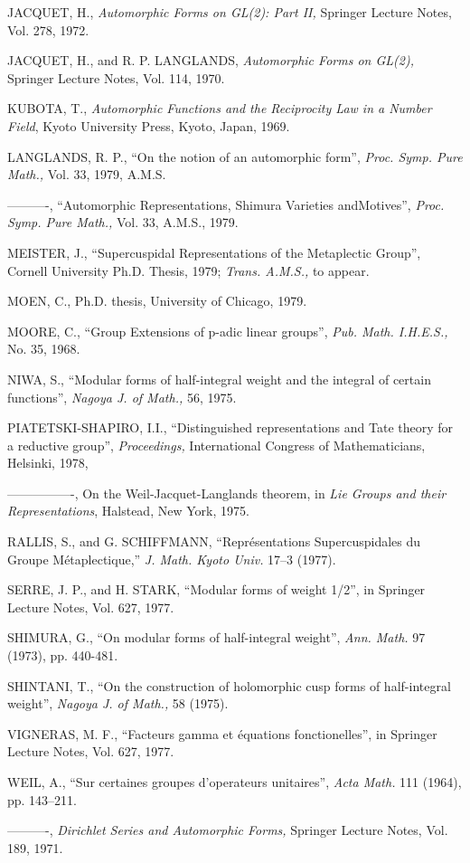 \begin{thebibliography}{99}
 JACQUET, H., {\em Automorphic Forms on GL(2): Part II,} Springer Lecture Notes, Vol. 278, 1972. 

 JACQUET, H., and R. P. LANGLANDS, {\em Automorphic Forms on GL(2),} Springer Lecture Notes, Vol. 114, 1970. 

 KUBOTA, T., {\em Automorphic Functions and the Reciprocity Law in a Number Field}, Kyoto University Press, Kyoto, Japan, 1969. 

 LANGLANDS, R. P., ``On the notion of an automorphic form'', {\em Proc. Symp. Pure Math.,} Vol. 33, 1979, A.M.S. 

----------, ``Automorphic Representations, Shimura Varieties and\pageoriginale Motives'', {\em Proc. Symp. Pure Math.,} Vol. 33, A.M.S., 1979.

 MEISTER, J., ``Supercuspidal Representations of the Metaplectic Group'', Cornell University Ph.D. Thesis, 1979; {\em Trans. A.M.S.,} to appear. 

 MOEN, C., Ph.D. thesis, University of Chicago, 1979. 

 MOORE, C., ``Group Extensions of p-adic linear groups'', {\em Pub. Math. I.H.E.S.,} No. 35, 1968. 

 NIWA, S., ``Modular forms of half-integral weight and the integral of certain functions'', {\em Nagoya J. of Math.,} 56, 1975. 

 PIATETSKI-SHAPIRO, I.I., ``Distinguished representations and Tate theory for a reductive group'', {\em Proceedings,} International Congress of Mathematicians, Helsinki, 1978, 

----------------, On the Weil-Jacquet-Langlands theorem, in {\em Lie Groups and their Representations}, Halstead, New York, 1975. 

 RALLIS, S., and G. SCHIFFMANN, ``Repr\'esentations Supercuspidales du Groupe M\'etaplectique,'' {\em J. Math. Kyoto Univ.} 17--3 (1977). 

 SERRE, J. P., and H. STARK, ``Modular forms of weight 1/2'', in Springer Lecture Notes, Vol. 627, 1977. 

 SHIMURA, G., ``On modular forms of half-integral weight'', {\em Ann. Math.} 97 (1973), pp. 440-481. 

 SHINTANI, T., ``On the construction of holomorphic cusp forms of half-integral weight'', {\em Nagoya J. of Math.,} 58 (1975). 

 VIGNERAS, M. F., ``Facteurs gamma et \'equations fonctionelles'', in Springer Lecture Notes, Vol. 627, 1977. 

 WEIL, A., ``Sur certaines groupes d'operateurs unitaires'', {\em Acta Math.} 111 (1964), pp. 143--211. 

----------, {\em Dirichlet Series and Automorphic Forms,} Springer Lecture Notes, Vol. 189, 1971. 
\end{thebibliography}
